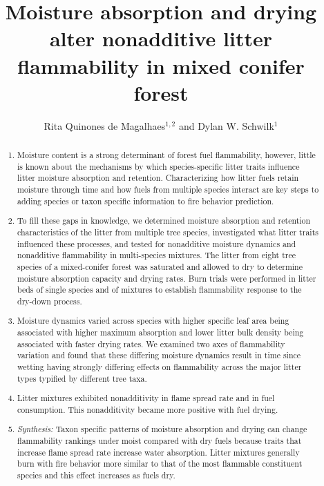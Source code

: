 \documentclass[letterpaper,12pt]{article}
\title{Moisture absorption and drying alter nonadditive litter flammability
  in mixed conifer forest}
\author{Rita Quinones de Magalhaes$^{1,2}$ and Dylan W. Schwilk$^1$}
\begin{document}
\maketitle

\begin{abstract}
  \noindent \begin{enumerate}
    
      \item Moisture content is a strong determinant of forest fuel
    flammability, however, little is known about the mechanisms by which
    species-specific litter traits influence litter moisture absorption and
    retention. Characterizing how litter fuels retain moisture through time and
    how fuels from multiple species interact are key steps to adding species or
    taxon specific information to fire behavior prediction.

      \item To fill these gaps in knowledge, we determined moisture absorption
    and retention characteristics of the litter from multiple tree species,
    investigated what litter traits influenced these processes, and tested for
    nonadditive moisture dynamics and nonadditive flammability in multi-species
    mixtures. The litter from eight tree species of a mixed-conifer forest was
    saturated and allowed to dry to determine moisture absorption capacity and
    drying rates. Burn trials were performed in litter beds of single species
    and of mixtures to establish flammability response to the dry-down process.
    
      \item Moisture dynamics varied across species with higher specific leaf
    area being associated with higher maximum absorption and lower litter bulk
    density being associated with faster drying rates. We examined two axes of
    flammability variation and found that these differing moisture dynamics
    result in time since wetting having strongly differing effects on
    flammability across the major litter types typified by different tree taxa.

    \item Litter mixtures exhibited nonadditivity in flame spread rate and
    in fuel consumption. This nonadditivity became more positive with fuel
    drying.
    
      \item \emph{Synthesis:} Taxon specific patterns of moisture absorption
    and drying can change flammability rankings under moist compared with dry
    fuels because traits that increase flame spread rate increase water
    absorption. Litter mixtures generally burn with fire behavior more similar
    to that of the most flammable constituent species and this effect increases
    as fuels dry.
    
  \end{enumerate}
\end{abstract}
\end{document}
